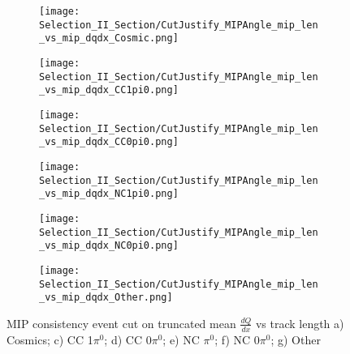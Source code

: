 \begin{figure}[H]
\centering
  \begin{subfigure}[t]{0.35\textwidth}
    \centering
\texttt{[image: Selection\_II\_Section/CutJustify\_MIPAngle\_mip\_len\_vs\_mip\_dqdx\_Cosmic.png]}
    \caption{ }
  \end{subfigure} 
  \hspace{3mm}
  \begin{subfigure}[t]{0.35\textwidth}
    \centering
\texttt{[image: Selection\_II\_Section/CutJustify\_MIPAngle\_mip\_len\_vs\_mip\_dqdx\_CC1pi0.png]}
    \caption{ }
  \end{subfigure} 
  \hspace{3mm}
  \begin{subfigure}[t]{0.35\textwidth}
    \centering
\texttt{[image: Selection\_II\_Section/CutJustify\_MIPAngle\_mip\_len\_vs\_mip\_dqdx\_CC0pi0.png]}
    \caption{ }
  \end{subfigure} 
    \hspace{3mm}
  \begin{subfigure}[t]{0.35\textwidth}
    \centering
\texttt{[image: Selection\_II\_Section/CutJustify\_MIPAngle\_mip\_len\_vs\_mip\_dqdx\_NC1pi0.png]}
    \caption{ }
  \end{subfigure} 
  \hspace{3mm}
  \begin{subfigure}[t]{0.35\textwidth}
    \centering
\texttt{[image: Selection\_II\_Section/CutJustify\_MIPAngle\_mip\_len\_vs\_mip\_dqdx\_NC0pi0.png]}
    \caption{ }
  \end{subfigure}
    \hspace{3mm}
  \begin{subfigure}[t]{0.35\textwidth}
    \centering
\texttt{[image: Selection\_II\_Section/CutJustify\_MIPAngle\_mip\_len\_vs\_mip\_dqdx\_Other.png]}
    \caption{ }
  \end{subfigure} 
\caption{ MIP consistency event cut on truncated mean $\frac{dQ}{dx}$ vs track length a) Cosmics; c) CC 1$\pi^0$; d) CC 0$\pi^0$; e) NC $\pi^0$; f) NC 0$\pi^0$; g) Other }
\label{fig:cutjust_mip_2d}
\end{figure}

